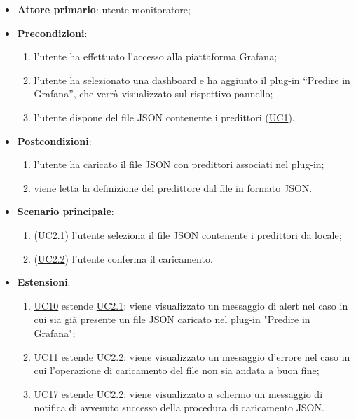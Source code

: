 		\begin{itemize}
			\item\textbf{Attore primario}: utente monitoratore;
			\item\textbf{Precondizioni}:
				\begin{enumerate}
					\item l’utente ha effettuato l’accesso alla piattaforma Grafana;
					\item l’utente ha selezionato una dashboard e ha aggiunto il plug-in “Predire in Grafana”, che verrà visualizzato sul rispettivo pannello;
					\item l’utente dispone del file JSON contenente i predittori (\hyperref[par:UC1]{UC1}).
				\end{enumerate}
			\item\textbf{Postcondizioni}:
				\begin{enumerate}
					\item l’utente ha caricato il file JSON con predittori associati nel plug-in;
					\item viene letta la definizione del predittore dal file in formato JSON.
				\end{enumerate}
			\item\textbf{Scenario principale}:
				\begin{enumerate}
					\item (\hyperref[par:UC2.1]{UC2.1}) l’utente seleziona il file JSON contenente i predittori da locale;
					\item (\hyperref[par:UC2.2]{UC2.2}) l'utente conferma il caricamento.
				\end{enumerate}
			\item\textbf{Estensioni}:
				\begin{enumerate}
					\item\hyperref[par:UC10]{UC10} estende \hyperref[par:UC2.1]{UC2.1}: viene visualizzato un messaggio di alert nel caso in cui sia già presente un file JSON caricato nel plug-in "Predire in Grafana";
					\item\hyperref[par:UC11]{UC11} estende \hyperref[par:UC2.2]{UC2.2}: viene visualizzato un messaggio d’errore nel caso in cui l’operazione di caricamento del file non sia andata a buon fine;
					\item\hyperref[par:UC17]{UC17} estende \hyperref[par:UC2.2]{UC2.2}: viene visualizzato a schermo un messaggio di notifica di avvenuto successo della procedura di caricamento JSON.
				\end{enumerate}	
			
		\end{itemize}
		
